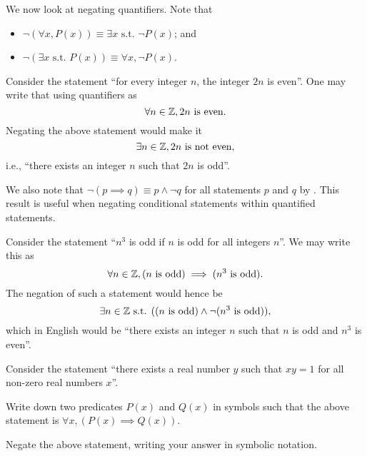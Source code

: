 We now look at negating quantifiers. Note that
\begin{itemize}
    \item $\lnot(\forall x, P(x)) \equiv \exists x \text{ s.t. } \lnot P(x)$; and
    \item $\lnot(\exists x \text{ s.t. } P(x)) \equiv \forall x, \lnot P(x)$.
\end{itemize}

\begin{example}
    Consider the statement ``for every integer $n$, the integer $2n$ is even''. One may write that using quantifiers as
    \[
        \forall n \in\mathbb{Z}, 2n \text{ is even}.
    \]
    Negating the above statement would make it
    \[
        \exists n \in \mathbb{Z}, 2n \text{ is not even},
    \]
    i.e., ``there exists an integer $n$ such that $2n$ is odd''.
\end{example}

We also note that $\lnot(p \implies q) \equiv p \land \lnot q$ for all statements $p$ and $q$ by . This result is useful when negating conditional statements within quantified statements.

\begin{example}
    Consider the statement ``$n^3$ is odd if $n$ is odd for all integers $n$''. We may write this as
    \[
        \forall n \in \mathbb{Z}, (n \text{ is odd}) \implies (n^3 \text{ is odd}).
    \]
    The negation of such a statement would hence be
    \[
        \exists n \in \mathbb{Z} \text{ s.t. }((n \text{ is odd}) \land \lnot(n^3 \text{ is odd})),
    \]
    which in English would be ``there exists an integer $n$ such that $n$ is odd and $n^3$ is even''.
\end{example}

\begin{exercise}
    Consider the statement ``there exists a real number $y$ such that $xy = 1$ for all non-zero real numbers $x$''.
    \begin{partquestions}{\roman*}
        \item Write down two predicates $P(x)$ and $Q(x)$ in symbols such that the above statement is $\forall x,(P(x) \implies Q(x))$.
        \item Negate the above statement, writing your answer in symbolic notation.
    \end{partquestions}
\end{exercise}

